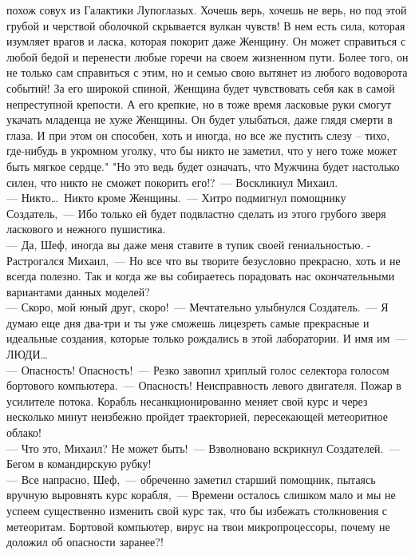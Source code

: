 похож совух из Галактики Лупоглазых. Хочешь верь, хочешь не верь, но под
этой грубой и черствой оболочкой скрывается вулкан чувств! В нем есть 
сила, которая изумляет врагов и ласка, которая покорит даже Женщину. Он 
может справиться с любой бедой и перенести любые горечи на своем 
жизненном пути. Более того, он  не только сам справиться с этим, но и 
семью свою вытянет из любого водоворота событий! За его широкой спиной, 
Женщина будет чувствовать себя как в самой непреступной крепости. А его 
крепкие, но в тоже время ласковые руки смогут укачать младенца не хуже 
Женщины. Он будет улыбаться, даже глядя смерти в глаза. И при этом он 
способен, хоть и иногда, но все же пустить слезу – тихо, где-нибудь в 
укромном уголку, что бы никто не заметил, что у него тоже может быть 
мягкое сердце."   "Но это ведь будет означать, что Мужчина будет 
настолько силен, что никто не сможет покорить его!?~--- Воскликнул 
Михаил.\\ 
--- Никто\ldots\ Никто кроме Женщины.~--- Хитро подмигнул помощнику 
Создатель,~--- Ибо только ей будет подвластно сделать из этого грубого 
зверя ласкового и нежного пушистика.\\
--- Да, Шеф, иногда вы даже меня ставите в тупик своей гениальностью. -
Растрогался Михаил,~--- Но все что вы творите безусловно прекрасно, хоть и
не всегда полезно. Так и когда же вы собираетесь порадовать нас 
окончательными вариантами данных моделей?\\ 
--- Скоро, мой юный друг, скоро!~--- Мечтательно улыбнулся Создатель.~--- Я 
думаю еще дня два-три и ты уже сможешь лицезреть самые прекрасные и идеальные 
создания, которые только рождались в этой лаборатории. И имя им~--- ЛЮДИ\ldots\\
--- Опасность! Опасность!~--- Резко завопил хриплый голос селектора 
голосом бортового компьютера.~--- Опасность! Неисправность левого 
двигателя. Пожар в усилителе потока. Корабль несанкционированно меняет 
свой курс и через несколько минут неизбежно пройдет траекторией, 
пересекающей метеоритное облако!\\
--- Что это, Михаил? Не может быть!~--- Взволновано вскрикнул Создателей.~--- 
Бегом в командирскую рубку!\\
--- Все напрасно, Шеф,~--- обреченно заметил старший помощник, пытаясь 
вручную выровнять курс корабля,~--- Времени осталось слишком мало и  мы не
успеем существенно изменить свой курс так, что бы избежать столкновения
с метеоритам. Бортовой компьютер, вирус на твои микропроцессоры, почему
не доложил об опасности заранее?!\\ 
